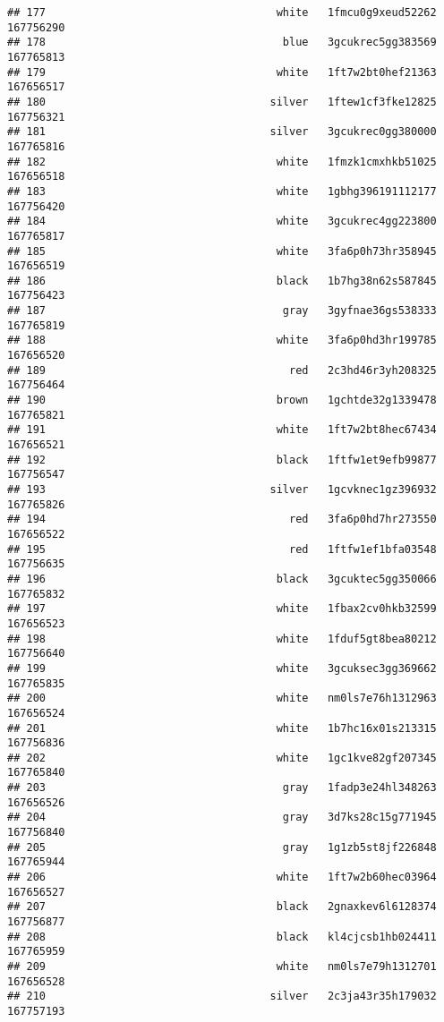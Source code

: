 \documentclass[
]{article}
\begin{document}
\begin{verbatim}
## 177                                    white   1fmcu0g9xeud52262 167756290
## 178                                     blue   3gcukrec5gg383569 167765813
## 179                                    white   1ft7w2bt0hef21363 167656517
## 180                                   silver   1ftew1cf3fke12825 167756321
## 181                                   silver   3gcukrec0gg380000 167765816
## 182                                    white   1fmzk1cmxhkb51025 167656518
## 183                                    white   1gbhg396191112177 167756420
## 184                                    white   3gcukrec4gg223800 167765817
## 185                                    white   3fa6p0h73hr358945 167656519
## 186                                    black   1b7hg38n62s587845 167756423
## 187                                     gray   3gyfnae36gs538333 167765819
## 188                                    white   3fa6p0hd3hr199785 167656520
## 189                                      red   2c3hd46r3yh208325 167756464
## 190                                    brown   1gchtde32g1339478 167765821
## 191                                    white   1ft7w2bt8hec67434 167656521
## 192                                    black   1ftfw1et9efb99877 167756547
## 193                                   silver   1gcvknec1gz396932 167765826
## 194                                      red   3fa6p0hd7hr273550 167656522
## 195                                      red   1ftfw1ef1bfa03548 167756635
## 196                                    black   3gcuktec5gg350066 167765832
## 197                                    white   1fbax2cv0hkb32599 167656523
## 198                                    white   1fduf5gt8bea80212 167756640
## 199                                    white   3gcuksec3gg369662 167765835
## 200                                    white   nm0ls7e76h1312963 167656524
## 201                                    white   1b7hc16x01s213315 167756836
## 202                                    white   1gc1kve82gf207345 167765840
## 203                                     gray   1fadp3e24hl348263 167656526
## 204                                     gray   3d7ks28c15g771945 167756840
## 205                                     gray   1g1zb5st8jf226848 167765944
## 206                                    white   1ft7w2b60hec03964 167656527
## 207                                    black   2gnaxkev6l6128374 167756877
## 208                                    black   kl4cjcsb1hb024411 167765959
## 209                                    white   nm0ls7e79h1312701 167656528
## 210                                   silver   2c3ja43r35h179032 167757193

\end{verbatim}
\end{document}
